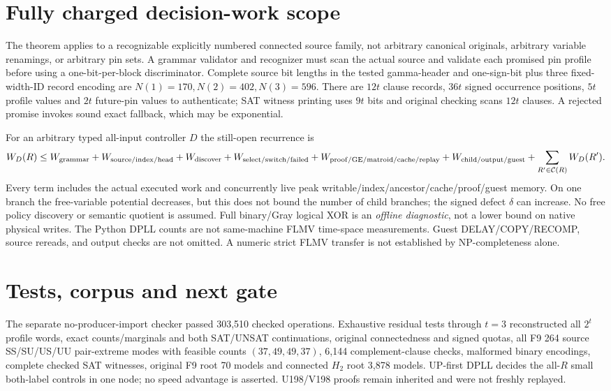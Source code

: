 \documentclass[11pt]{article}
\begin{document}
\section{Fully charged decision-work scope}
The theorem applies to a recognizable explicitly numbered connected source family, not arbitrary canonical originals, arbitrary variable renamings, or arbitrary pin sets. A grammar validator and recognizer must scan the actual source and validate each promised pin profile before using a one-bit-per-block discriminator. Complete source bit lengths in the tested gamma-header and one-sign-bit plus three fixed-width-ID record encoding are $N(1)=170,N(2)=402,N(3)=596$. There are $12t$ clause records, $36t$ signed occurrence positions, $5t$ profile values and $2t$ future-pin values to authenticate; SAT witness printing uses $9t$ bits and original checking scans $12t$ clauses. A rejected promise invokes sound exact fallback, which may be exponential.

For an arbitrary typed all-input controller $D$ the still-open recurrence is
\[
W_D(R)\le W_{\rm grammar}+W_{\rm source/index/head}
+W_{\rm discover}+W_{\rm select/switch/failed}
+W_{\rm proof/GE/matroid/cache/replay}
+W_{\rm child/output/guest}+\sum_{R'\in\mathcal C(R)}W_D(R').
\]
Every term includes the actual executed work and concurrently live peak writable/index/ancestor/cache/proof/guest memory. On one branch the free-variable potential decreases, but this does not bound the number of child branches; the signed defect $\delta$ can increase. No free policy discovery or semantic quotient is assumed. Full binary/Gray logical XOR is an \emph{offline diagnostic}, not a lower bound on native physical writes. The Python DPLL counts are not same-machine FLMV time-space measurements. Guest DELAY/COPY/RECOMP, source rereads, and output checks are not omitted. A numeric strict FLMV transfer is not established by NP-completeness alone.

\section{Tests, corpus and next gate}
The separate no-producer-import checker passed 303,510 checked operations. Exhaustive residual tests through $t=3$ reconstructed all $2^t$ profile words, exact counts/marginals and both SAT/UNSAT continuations, original connectedness and signed quotas, all F9 264 source SS/SU/US/UU pair-extreme modes with feasible counts $(37,49,49,37)$, 6,144 complement-clause checks, malformed binary encodings, complete checked SAT witnesses, original F9 root 70 models and connected $H_2$ root 3,878 models. UP-first DPLL decides the all-$R$ small both-label controls in one node; no speed advantage is asserted. U198/V198 proofs remain inherited and were not freshly replayed.
\end{document}

